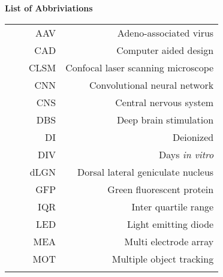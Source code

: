 \Large{\textbf{List of Abbriviations}} \\ 
\normalsize
\vspace{2mm}

\begin{adjustbox}{max width=\textwidth,left}
    \begin{tabular}{@{}rrrr@{}}
        \vspace{2mm}
        &&AAV &          Adeno-associated virus \\ \vspace{2mm}
        &&CAD &          Computer aided design\\ \vspace{2mm}
        &&CLSM  &        Confocal laser scanning microscope \\ \vspace{2mm}
        &&CNN  &         Convolutional neural network \\ \vspace{2mm}
        &&CNS &          Central nervous system \\ \vspace{2mm}
        &&DBS &          Deep brain stimulation \\ \vspace{2mm}
        &&DI  &          Deionized \\ \vspace{2mm}
        &&DIV &          Days \textit{in vitro} \\ \vspace{2mm}
        &&dLGN &         Dorsal lateral geniculate nucleus \\ \vspace{2mm}
        &&GFP &          Green fluorescent protein \\ \vspace{2mm}
        &&IQR &          Inter quartile range \\ \vspace{2mm}
        &&LED &          Light emitting diode \\ \vspace{2mm}
        &&MEA &          Multi electrode array \\ \vspace{2mm}
        &&MOT &          Multiple object tracking \\ \vspace{2mm}

\end{tabular}
\end{adjustbox}
